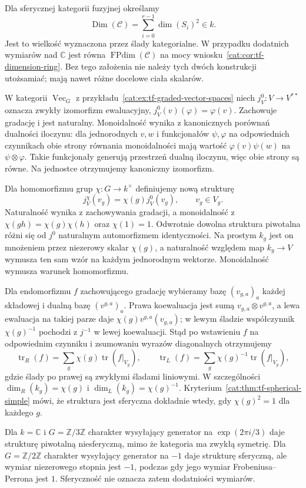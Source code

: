\begin{definicja}\label{cat:def:tf-global-dimension}
Dla sferycznej kategorii fuzyjnej określamy
\[
 \operatorname{Dim}(\mathcal C)=\sum_{i=0}^{r-1}\dim(S_i)^2\in k.
\]
Jest to wielkość wyznaczona przez ślady kategorialne. W przypadku dodatnich wymiarów nad $\mathbb C$ jest równa $\operatorname{FPdim}(\mathcal C)$ na mocy wniosku~\ref{cat:cor:tf-dimension-ring}. Bez tego założenia nie należy tych dwóch konstrukcji utożsamiać; mają nawet różne docelowe ciała skalarów.
\end{definicja}

\begin{przyklad}\label{cat:ex:tf-graded-pivotal}
W kategorii $\operatorname{Vec}_G$ z przykładu~\ref{cat:ex:tf-graded-vector-spaces} niech $j^0_V:V\to V^{**}$ oznacza zwykły izomorfizm ewaluacyjny, $j^0_V(v)(\varphi)=\varphi(v)$. Zachowuje gradację i jest naturalny. Monoidalność wynika z kanonicznych porównań dualności iloczynu: dla jednorodnych $v,w$ i funkcjonałów $\psi,\varphi$ na odpowiednich czynnikach obie strony równania monoidalności mają wartość $\varphi(v)\psi(w)$ na $\psi\otimes\varphi$. Takie funkcjonały generują przestrzeń dualną iloczynu, więc obie strony są równe. Na jednostce otrzymujemy kanoniczny izomorfizm.

Dla homomorfizmu grup $\chi:G\to k^\times$ definiujemy nową strukturę
\[
 j^\chi_V(v_g)=\chi(g)j^0_V(v_g),\qquad v_g\in V_g.
\]
Naturalność wynika z zachowywania gradacji, a monoidalność z $\chi(gh)=\chi(g)\chi(h)$ oraz $\chi(1)=1$. Odwrotnie dowolna struktura piwotalna różni się od $j^0$ naturalnym automorfizmem identyczności. Na prostym $k_g$ jest on mnożeniem przez niezerowy skalar $\chi(g)$, a naturalność względem map $k_g\to V$ wymusza ten sam wzór na każdym jednorodnym wektorze. Monoidalność wymusza warunek homomorfizmu.

Dla endomorfizmu $f$ zachowującego gradację wybieramy bazę $(v_{g,a})_a$ każdej składowej i dualną bazę $(v^{g,a})_a$. Prawa koewaluacja jest sumą $v_{g,a}\otimes v^{g,a}$, a lewa ewaluacja na takiej parze daje $\chi(g)v^{g,a}(v_{g,a})$; w lewym śladzie współczynnik $\chi(g)^{-1}$ pochodzi z $j^{-1}$ w lewej koewaluacji. Stąd po wstawieniu $f$ na odpowiednim czynniku i zsumowaniu wyrazów diagonalnych otrzymujemy
\[
 \operatorname{tr}_R(f)=\sum_g\chi(g)\operatorname{tr}(f|_{V_g}),
 \qquad
 \operatorname{tr}_L(f)=\sum_g\chi(g)^{-1}\operatorname{tr}(f|_{V_g}),
\]
gdzie ślady po prawej są zwykłymi śladami liniowymi. W szczególności $\dim_R(k_g)=\chi(g)$ i $\dim_L(k_g)=\chi(g)^{-1}$. Kryterium~\ref{cat:thm:tf-spherical-simple} mówi, że struktura jest sferyczna dokładnie wtedy, gdy $\chi(g)^2=1$ dla każdego $g$.

Dla $k=\mathbb C$ i $G=\mathbb Z/3\mathbb Z$ charakter wysyłający generator na $\exp(2\pi i/3)$ daje strukturę piwotalną niesferyczną, mimo że kategoria ma zwykłą symetrię. Dla $G=\mathbb Z/2\mathbb Z$ charakter wysyłający generator na $-1$ daje strukturę sferyczną, ale wymiar niezerowego stopnia jest $-1$, podczas gdy jego wymiar Frobeniusa--Perrona jest $1$. Sferyczność nie oznacza zatem dodatniości wymiarów.
\end{przyklad}


